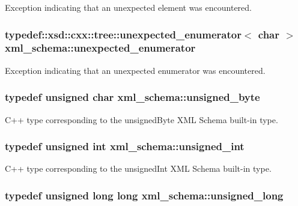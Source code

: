 Exception indicating that an unexpected element was encountered. 

\hypertarget{namespacexml__schema_a7601f5d15eeb816df6a0e1cb2b0f379b}{
\subsubsection[{unexpected\-\_\-enumerator}]{\setlength{\rightskip}{0pt plus 5cm}typedef\-::xsd\-::cxx\-::tree\-::unexpected\-\_\-enumerator$<$ char $>$ {\bf xml\-\_\-schema\-::unexpected\-\_\-enumerator}}}\label{namespacexml__schema_a7601f5d15eeb816df6a0e1cb2b0f379b}


Exception indicating that an unexpected enumerator was encountered. 

\hypertarget{namespacexml__schema_a876b68656d976c6343512f3d44fe8ca2}{
\subsubsection[{unsigned\-\_\-byte}]{\setlength{\rightskip}{0pt plus 5cm}typedef unsigned char {\bf xml\-\_\-schema\-::unsigned\-\_\-byte}}}\label{namespacexml__schema_a876b68656d976c6343512f3d44fe8ca2}


C++ type corresponding to the unsigned\-Byte X\-M\-L Schema built-\/in type. 

\hypertarget{namespacexml__schema_a85ca3205d8af287e149aac54535f57e7}{
\subsubsection[{unsigned\-\_\-int}]{\setlength{\rightskip}{0pt plus 5cm}typedef unsigned int {\bf xml\-\_\-schema\-::unsigned\-\_\-int}}}\label{namespacexml__schema_a85ca3205d8af287e149aac54535f57e7}


C++ type corresponding to the unsigned\-Int X\-M\-L Schema built-\/in type. 

\hypertarget{namespacexml__schema_a4413fbcf4c65ffc7aaafe465d72fcb33}{
\subsubsection[{unsigned\-\_\-long}]{\setlength{\rightskip}{0pt plus 5cm}typedef unsigned long long {\bf xml\-\_\-schema\-::unsigned\-\_\-long}}}\label{namespacexml__schema_a4413fbcf4c65ffc7aaafe465d72fcb33}


